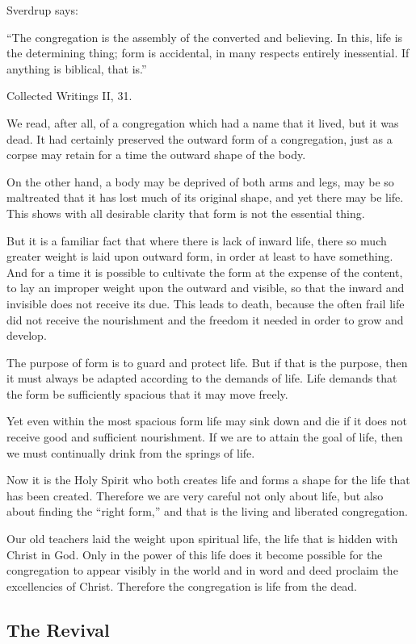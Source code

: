 Sverdrup says:

“The congregation is the assembly of the converted and believing. In this, life is the determining thing; form is accidental, in many respects entirely inessential. If anything is biblical, that is.”

Collected Writings II, 31.

We read, after all, of a congregation which had a name that it lived, but it was dead. It had certainly preserved the outward form of a congregation, just as a corpse may retain for a time the outward shape of the body.

On the other hand, a body may be deprived of both arms and legs, may be so maltreated that it has lost much of its original shape, and yet there may be life. This shows with all desirable clarity that form is not the essential thing.

But it is a familiar fact that where there is lack of inward life, there so much greater weight is laid upon outward form, in order at least to have something. And for a time it is possible to cultivate the form at the expense of the content, to lay an improper weight upon the outward and visible, so that the inward and invisible does not receive its due. This leads to death, because the often frail life did not receive the nourishment and the freedom it needed in order to grow and develop.

The purpose of form is to guard and protect life. But if that is the purpose, then it must always be adapted according to the demands of life. Life demands that the form be sufficiently spacious that it may move freely.

Yet even within the most spacious form life may sink down and die if it does not receive good and sufficient nourishment. If we are to attain the goal of life, then we must continually drink from the springs of life.

Now it is the Holy Spirit who both creates life and forms a shape for the life that has been created. Therefore we are very careful not only about life, but also about finding the “right form,” and that is the living and liberated congregation.

Our old teachers laid the weight upon spiritual life, the life that is hidden with Christ in God. Only in the power of this life does it become possible for the congregation to appear visibly in the world and in word and deed proclaim the excellencies of Christ. Therefore the congregation is life from the dead.

\subsection{The Revival}

